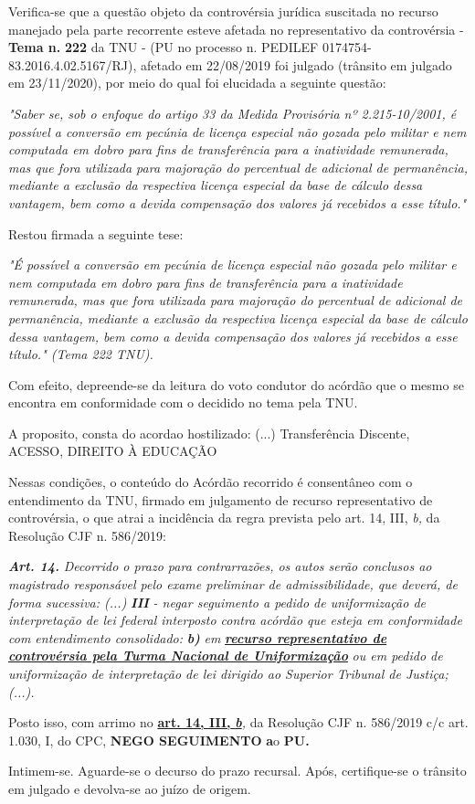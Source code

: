 \documentclass[12pt]{article}
\begin{document}
\justifying
\noindent Verifica-se que a questão objeto da controvérsia jurídica suscitada no recurso manejado pela parte recorrente esteve afetada no representativo da controvérsia - \textbf{Tema n. }\textbf{222} da TNU - (PU no processo n. PEDILEF 0174754-83.2016.4.02.5167/RJ),  afetado em 22/08/2019 foi julgado (trânsito em julgado em 23/11/2020), por meio do qual foi elucidada a seguinte questão:

\noindent \textit{"Saber se, sob o enfoque do artigo 33 da Medida Provisória nº 2.215-10/2001, é possível a conversão em pecúnia de licença especial não gozada pelo militar e nem computada em dobro para fins de transferência para a inatividade remunerada, mas que fora utilizada para majoração do percentual de adicional de permanência, mediante a exclusão da respectiva licença especial da base de cálculo dessa vantagem, bem como a devida compensação dos valores já recebidos a esse título."}

\noindent Restou firmada a seguinte tese:

\noindent \textit{"É possível a conversão em pecúnia de licença especial não gozada pelo militar e nem computada em dobro para fins de transferência para a inatividade remunerada, mas que fora utilizada para majoração do percentual de adicional de permanência, mediante a exclusão da respectiva licença especial da base de cálculo dessa vantagem, bem como a devida compensação dos valores já recebidos a esse título." (Tema 222 TNU).}

\noindent Com efeito, depreende-se da leitura do voto condutor do acórdão que o mesmo se encontra em conformidade com o decidido no  tema pela TNU.

\noindent A proposito, consta do acordao hostilizado: (...) Transferência Discente, ACESSO, DIREITO À EDUCAÇÃO

\noindent Nessas condições, o conteúdo do Acórdão recorrido é consentâneo com o entendimento da TNU, firmado em julgamento de recurso representativo de controvérsia, o que atrai a incidência da regra prevista pelo art. 14, III, \textit{b,} da Resolução CJF n. 586/2019:

\noindent \textit{\textbf{Art. 14.}}\textit{ Decorrido o prazo para contrarrazões, os autos serão conclusos ao magistrado responsável pelo exame preliminar de admissibilidade, que deverá, de forma sucessiva: (...) }\textit{\textbf{III }}\textit{- negar seguimento a pedido de uniformização de interpretação de lei federal interposto contra acórdão que esteja em conformidade com entendimento consolidado: }\textit{\textbf{b)}}\textit{ em }\uline{\textit{\textbf{recurso representativo de controvérsia pela Turma Nacional de Uniformização}}}\textit{ ou em pedido de uniformização de interpretação de lei dirigido ao Superior Tribunal de Justiça;(...).}

\noindent Posto isso, com arrimo no \uline{\textbf{art. 14, III, }}\uline{\textit{\textbf{b}}}\textit{,} da Resolução CJF n. 586/2019 c/c art. 1.030, I, do CPC, \textbf{NEGO SEGUIMENTO }\textbf{a}o\textbf{ PU}\textbf{.}

\noindent Intimem-se. Aguarde-se o decurso do prazo recursal. Após, certifique-se o trânsito em julgado e devolva-se ao juízo de origem.
\end{document}
